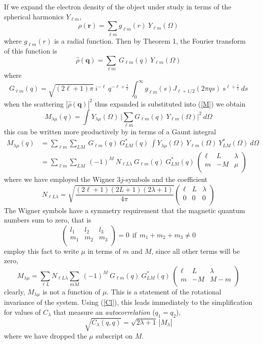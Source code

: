 \documentclass[aps,prl,preprint,groupedaddress]{revtex4-1}
\def\*#1{\mathbf{#1}}
\begin{document}
If we expand the electron density of the object under study in terms of the spherical harmonics $Y_{\ell m}$,
\[
\rho( \*r ) = \sum_{\ell m} g_{\ell m} (r) \> Y_{\ell m}(\Omega)
\]
where $g_{\ell m} (r)$ is a radial function. Then by Theorem 1, the Fourier transform of this function is
\[
\hat{\rho} (\*q) = \sum_{\ell m} \> G_{\ell m} (q) \> Y_{\ell m}(\Omega)
\]
where
\[
G_{\ell m} (q) = \sqrt{ (2 \ell + 1) \pi} \> i^{-\ell} \> q^{- \ell + \frac{1}{2} } \> \int_0^{\infty} g_{\ell m} (s) J_{\ell + 1/2} (2 \pi q s) \> s^{\ell + \frac{1}{2}} \> ds
\]
when the scattering $| \hat{\rho}(\*q) |^2$ thus expanded is substituted into (\ref{M}) we obtain
\[
M_{\lambda \mu}(q) = \int Y_{\lambda \mu} (\Omega) \> \Big|
\sum_{\ell m} G_{\ell m} (q) \> Y_{\ell m}(\Omega)
\Big|^2 \> d\Omega
\]
this can be written more productively by in terms of a Gaunt integral
\begin{align*}
M_{\lambda \mu}(q) &= \sum_{\ell m} \sum_{L M} \> G_{\ell m}(q) \> G_{L M}^* (q) \>
\int Y_{\lambda \mu} (\Omega) \> Y_{\ell m} (\Omega) \> Y_{LM}^* (\Omega) \> d\Omega \\
&= \sum_{\ell m} \sum_{L M} \> (-1)^M \> N_{\ell L \lambda} \> G_{\ell m}(q) \> G_{L M}^* (q) \>
\left( \begin{array}{ccc}
\ell & L & \lambda \\
m & -M & \mu \\
\end{array} \right)
\end{align*}
where we have employed the Wigner $3j$-symbols and the coefficient
\[
N_{\ell L \lambda} = \sqrt{ \frac{(2 \ell + 1)(2 L + 1)(2 \lambda + 1)}{4 \pi} } \left( \begin{array}{ccc}
\ell & L & \lambda \\
0 & 0 & 0 \\
\end{array} \right)
\]
The Wigner symbols have a symmetry requirement that the magnetic quantum numbers sum to zero, that is
\[
\left( \begin{array}{ccc}
l_1 & l_2 & l_3 \\
m_1 & m_2 & m_3 \\
\end{array} \right) = 0
\ \ \mathrm{if} \ \ 
m_1 + m_2 + m_3 \neq 0
\]
employ this fact to write $\mu$ in terms of $m$ and $M$, since all other terms will be zero,
\[
M_{\lambda \mu} = \sum_{\ell L} N_{\ell L \lambda}  \sum_{m M} \> (-1)^M \> G_{\ell m}(q) \> G_{L M}^* (q) \>
\left( \begin{array}{ccc}
\ell & L & \lambda \\
m & -M & M-m \\
\end{array} \right)
\]
clearly, $M_{\lambda \mu}$ is not a function of $\mu$. This is a statement of the rotational invariance of the system. Using (\ref{Cl}), this leads immediately to the simplification for values of $C_\lambda$ that measure an \emph{autocorrelation} ($q_1 = q_2$),
\[
\sqrt{C_\lambda (q, q)} = \sqrt{2 \lambda + 1} \, | M_\lambda |
\]
where we have dropped the $\mu$ subscript on $M$.
\end{document}
